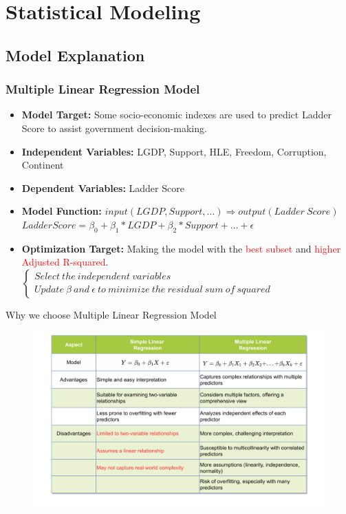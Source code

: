 \documentclass{beamer}
\begin{document}
\section{Statistical Modeling}
% 
% 
% 
% 
\subsection{Model Explanation}
% 
% 
% 
% 
\begin{frame}
  \frametitle{Multiple Linear Regression Model}
  \begin{itemize}
    \item \textbf{Model Target:} Some socio-economic indexes are used to predict Ladder Score to assist government decision-making.
    \item \textbf{Independent Variables:} LGDP, Support, HLE, Freedom, Corruption, Continent
    \item \textbf{Dependent Variables:} Ladder Score
    \item \textbf{Model Function:} $input(LGDP, Support,...) \Rightarrow output(Ladder\ Score)$
          $ Ladder Score = \beta_0 + \beta_1 * LGDP + \beta_2 * Support + ... + \epsilon $
    \item \textbf{Optimization Target:} Making the model with the \textcolor{red}{best subset} and \textcolor{red}{higher Adjusted R-squared}. $
            \left\{
            \begin{matrix}
              Select\ the\ independent\ variables \\
              Update\ \beta\ and\ \epsilon\ to\ minimize\ the\ residual\ sum\ of\ squared
            \end{matrix}
            \right.
          $
  \end{itemize}
\end{frame}
% 
% 
% 
% 
\begin{frame}{Why we choose Multiple Linear Regression Model}
  \begin{figure}
    \includegraphics[width=\textwidth]{img/Why choose this model.png}
  \end{figure}
\end{frame}
% 
% 
% 
% 
\end{document}
